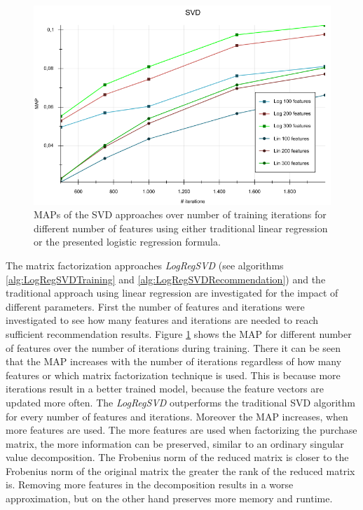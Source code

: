 \documentclass[10pt]{reportMaster}
\begin{document}
\begin{figure}
	\centering
	\includegraphics[width=1\textwidth]{figures/experiments/SVDIterations}
	\caption{MAPs of the SVD approaches over number of training iterations for different number of features using either traditional linear regression or the presented logistic regression formula.}
	\label{fig:SVDIterations}
\end{figure}

The matrix factorization approaches \textit{LogRegSVD} (see algorithms \ref{alg:LogRegSVDTraining} and \ref{alg:LogRegSVDRecommendation}) and the traditional approach using linear regression are investigated for the impact of different parameters.
First the number of features and iterations were investigated to see how many features and iterations are needed to reach sufficient recommendation results.
Figure \ref{fig:SVDIterations} shows the MAP for different number of features over the number of iterations during training.
There it can be seen that the MAP increases with the number of iterations regardless of how many features or which matrix factorization technique is used.
This is because more iterations result in a better trained model, because the feature vectors are updated more often.
The \textit{LogRegSVD} outperforms the traditional SVD algorithm for every number of features and iterations.
Moreover the MAP increases, when more features are used.
The more features are used when factorizing the purchase matrix, the more information can be preserved, similar to an ordinary singular value decomposition.
The Frobenius norm of the reduced matrix is closer to the Frobenius norm of the original matrix the greater the rank of the reduced matrix is.
Removing more features in the decomposition results in a worse approximation, but on the other hand preserves more memory and runtime.
\end{document}
